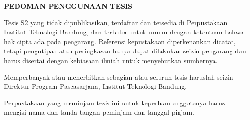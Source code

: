 \begin{center}
\large{\textbf{PEDOMAN PENGGUNAAN TESIS}}
\end{center}

Tesis S2 yang tidak dipublikasikan, terdaftar dan tersedia di Perpustakaan Institut Teknologi Bandung, dan  terbuka untuk umum dengan ketentuan bahwa hak cipta ada pada pengarang. Referensi kepustakaan diperkenankan dicatat, tetapi pengutipan atau peringkasan hanya dapat dilakukan seizin pengarang dan harus disertai dengan kebiasaan ilmiah untuk menyebutkan sumbernya.

Memperbanyak atau menerbitkan sebagian atau seluruh tesis haruslah seizin Direktur Program Pascasarjana, Institut Teknologi Bandung.

Perpustakaan yang meminjam tesis ini untuk keperluan anggotanya harus mengisi nama dan tanda tangan peminjam dan tanggal pinjam.